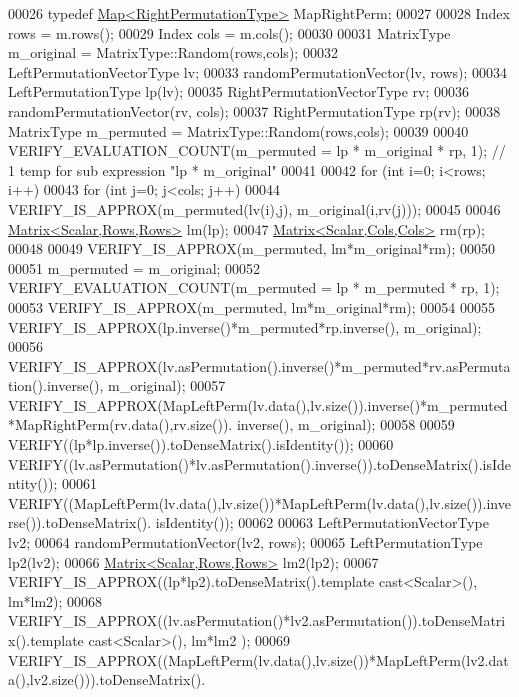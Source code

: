 \begin{DoxyCode}
00026   \textcolor{keyword}{typedef} \hyperlink{group___core___module_class_eigen_1_1_map}{Map<RightPermutationType>} MapRightPerm;
00027 
00028   Index rows = m.rows();
00029   Index cols = m.cols();
00030 
00031   MatrixType m\_original = MatrixType::Random(rows,cols);
00032   LeftPermutationVectorType lv;
00033   randomPermutationVector(lv, rows);
00034   LeftPermutationType lp(lv);
00035   RightPermutationVectorType rv;
00036   randomPermutationVector(rv, cols);
00037   RightPermutationType rp(rv);
00038   MatrixType m\_permuted = MatrixType::Random(rows,cols);
00039   
00040   VERIFY\_EVALUATION\_COUNT(m\_permuted = lp * m\_original * rp, 1); \textcolor{comment}{// 1 temp for sub expression "lp *
       m\_original"}
00041 
00042   \textcolor{keywordflow}{for} (\textcolor{keywordtype}{int} i=0; i<rows; i++)
00043     \textcolor{keywordflow}{for} (\textcolor{keywordtype}{int} j=0; j<cols; j++)
00044         VERIFY\_IS\_APPROX(m\_permuted(lv(i),j), m\_original(i,rv(j)));
00045 
00046   \hyperlink{group___core___module_class_eigen_1_1_matrix}{Matrix<Scalar,Rows,Rows>} lm(lp);
00047   \hyperlink{group___core___module_class_eigen_1_1_matrix}{Matrix<Scalar,Cols,Cols>} rm(rp);
00048 
00049   VERIFY\_IS\_APPROX(m\_permuted, lm*m\_original*rm);
00050   
00051   m\_permuted = m\_original;
00052   VERIFY\_EVALUATION\_COUNT(m\_permuted = lp * m\_permuted * rp, 1);
00053   VERIFY\_IS\_APPROX(m\_permuted, lm*m\_original*rm);
00054   
00055   VERIFY\_IS\_APPROX(lp.inverse()*m\_permuted*rp.inverse(), m\_original);
00056   VERIFY\_IS\_APPROX(lv.asPermutation().inverse()*m\_permuted*rv.asPermutation().inverse(), m\_original);
00057   VERIFY\_IS\_APPROX(MapLeftPerm(lv.data(),lv.size()).inverse()*m\_permuted*MapRightPerm(rv.data(),rv.size()).
      inverse(), m\_original);
00058   
00059   VERIFY((lp*lp.inverse()).toDenseMatrix().isIdentity());
00060   VERIFY((lv.asPermutation()*lv.asPermutation().inverse()).toDenseMatrix().isIdentity());
00061   VERIFY((MapLeftPerm(lv.data(),lv.size())*MapLeftPerm(lv.data(),lv.size()).inverse()).toDenseMatrix().
      isIdentity());
00062 
00063   LeftPermutationVectorType lv2;
00064   randomPermutationVector(lv2, rows);
00065   LeftPermutationType lp2(lv2);
00066   \hyperlink{group___core___module_class_eigen_1_1_matrix}{Matrix<Scalar,Rows,Rows>} lm2(lp2);
00067   VERIFY\_IS\_APPROX((lp*lp2).toDenseMatrix().\textcolor{keyword}{template} cast<Scalar>(), lm*lm2);
00068   VERIFY\_IS\_APPROX((lv.asPermutation()*lv2.asPermutation()).toDenseMatrix().template cast<Scalar>(), lm*lm2
      );
00069   VERIFY\_IS\_APPROX((MapLeftPerm(lv.data(),lv.size())*MapLeftPerm(lv2.data(),lv2.size())).toDenseMatrix().

\end{DoxyCode}
